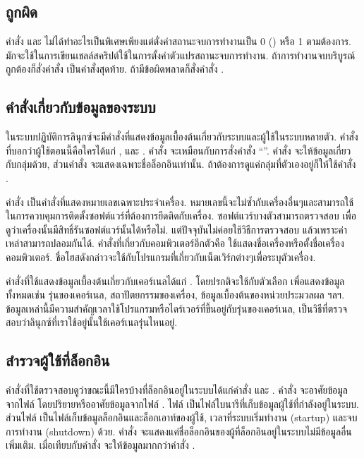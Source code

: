 \begin{thwbr}
\subsection{ถูกผิด}
คำสั่ง  และ  ไม่ได้ทำอะไรเป็นพิเศษเพียงแต่ตั่งค่าสถานะจบการทำงานเป็น 0 () หรือ 1  ตามต้องการ. มักจะใช้ในการเขียนเชลล์สคริปต์ใช้ในการตั้งค่าตัวแปรสถานะจบการทำงาน. ถ้าการทำงานจบบริบูรณ์ถูกต้องก็สั่งคำสั่ง  เป็นคำสั่งสุดท้าย. ถ้ามีข้อผิดพลาดก็สั่งคำสั่ง .

\subsection{คำสั่งเกี่ยวกับข้อมูลของระบบ}
ในระบบปฏิบัติการลินุกซ์จะมีคำสั่งที่แสดงข้อมูลเบื้องต้นเกี่ยวกับระบบและผู้ใช้ในระบบหลายตัว. คำสั่งที่บอกว่าผู้ใช้ตอนนี้คือใครได้แก่ ,  และ . คำสั่ง  จะเหมือนกับการสั่งคำสั่ง ``''. คำสั่ง  จะให้ข้อมูลเกี่ยวกับกลุ่มด้วย, ส่วนคำสั่ง  จะแสดงเฉพาะชื่อล็อกอินเท่านั้น. ถ้าต้องการดูแค่กลุ่มที่ตัวเองอยู่ก็ให้ใช้คำสั่ง . 

คำสั่ง  เป็นคำสั่งที่แสดงหมายเลขเฉพาะประจำเครื่อง. หมายเลขนี้จะไม่ซ้ำกับเครื่องอื่นๆและสามารถใช้ในการควบคุมการติดตั้งซอฟต์แวร์ที่ต้องการยึดติดกับเครื่อง. ซอฟต์แวร์บางตัวสามารถตรวจสอบ  เพื่อดูว่าเครื่องนั้นมีสิทธิ์รันซอฟต์แวร์นั้นได้หรือไม่. แต่ปัจจุบันไม่ค่อยใช้วิธีการตรวจสอบ  แล้วเพราะค่าเหล่าสามารถปลอมกันได้. คำสั่งที่เกี่ยวกับคอมพิวเตอร์อีกตัวคือ  ใช้แสดงชื่อเครื่องหรือตั้งชื่อเครื่องคอมพิวเตอร์. ชื่อโฮสดังกล่าวจะใช้กับโปรแกรมที่เกี่ยวกับเน็ตเวิร์กต่างๆเพื่อระบุตัวเครื่อง. 

คำสั่งที่ใช้แสดงข้อมูลเบื้องต้นเกี่ยวกับเคอร์เนลได้แก่ . โดยปรกติจะใช้กับตัวเลือก  เพื่อแสดงข้อมูลทั้งหมดเช่น รุ่นของเคอร์เนล, สถาปัตยกรรมของเครื่อง, ข้อมูลเบื้องต้นของหน่วยประมวลผล ฯลฯ. ข้อมูลเหล่านี้มีความสำคัญเวลาใช้โปรแกรมหรือไดร์เวอร์ที่ขึ้นอยู่กับรุ่นของเคอร์เนล, เป็นวิธีที่ตรวจสอบว่าลินุกซ์ที่เราใช้อยู่นั้นใช้เคอร์เนลรุ่นไหนอยู่.

\subsection{สำรวจผู้ใช้ที่ล็อกอิน}
คำสั่งที่ใช้ตรวจสอบดูว่าขณะนี้มีใครบ้างที่ล็อกอินอยู่ในระบบได้แก่คำสั่ง  และ . คำสั่ง  จะอาศัยข้อมูลจากไฟล์  โดยปริยายหรืออาศัยข้อมูลจากไฟล์ . ไฟล์  เป็นไฟล์ไบนารีที่เก็บข้อมูลผู้ใช้ที่กำลังอยู่ในระบบ. ส่วนไฟล์  เป็นไฟล์เก็บข้อมูลล็อกอินและล็อกเอาท์ของผู้ใช้, เวลาที่ระบบเริ่มทำงาน (startup) และจบการทำงาน (shutdown) ด้วย. คำสั่ง  จะแสดงแค่ชื่อล็อกอินของผู้ที่ล็อกอินอยู่ในระบบไม่มีข้อมูลอื่นเพิ่มเติม. เมื่อเทียบกับคำสั่ง  จะให้ข้อมูลมากกว่าคำสั่ง .



\end{thwbr}
